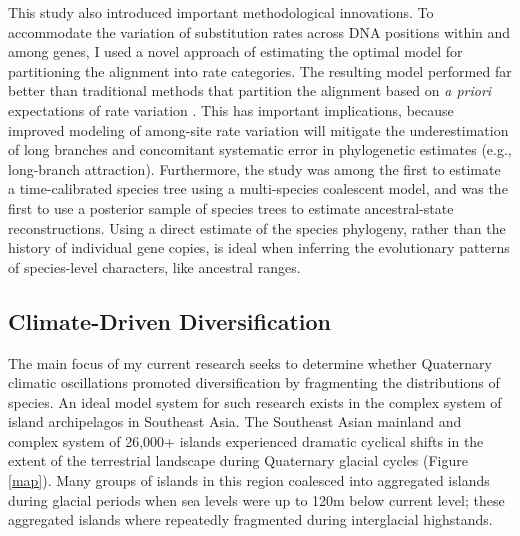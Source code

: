 \documentclass[10pt]{article}
\begin{document}
This study also introduced important methodological innovations.
To accommodate the variation of substitution rates across DNA positions
within and among genes, I used a novel approach of estimating the optimal model
for partitioning the alignment into rate categories.
The resulting model performed far better than traditional methods that
partition the alignment based on \emph{a priori} expectations of rate variation
.
This has important implications, because improved modeling of among-site rate
variation will mitigate the underestimation of long branches and concomitant
systematic error in phylogenetic estimates (e.g., long-branch attraction).
Furthermore, the study was among the first to estimate a time-calibrated
species tree using a multi-species coalescent model, and was the first to use a
posterior sample of species trees to estimate ancestral-state reconstructions.
Using a direct estimate of the species phylogeny, rather than the history of
individual gene copies, is ideal when inferring the evolutionary patterns of
species-level characters, like ancestral ranges.

\subsection*{Climate-Driven Diversification}
The main focus of my current research seeks to determine whether Quaternary
climatic oscillations promoted diversification by fragmenting the distributions
of species.
An ideal model system for such research exists in the complex system of island
archipelagos in Southeast Asia.
The Southeast Asian mainland and complex system of 26,000+ islands experienced
dramatic cyclical shifts in the extent of the terrestrial landscape during
Quaternary glacial cycles (Figure \ref{map}).
Many groups of islands in this region coalesced into aggregated islands during
glacial periods when sea levels were up to 120m below current level; these
aggregated islands where repeatedly fragmented during interglacial highstands.
\end{document}
